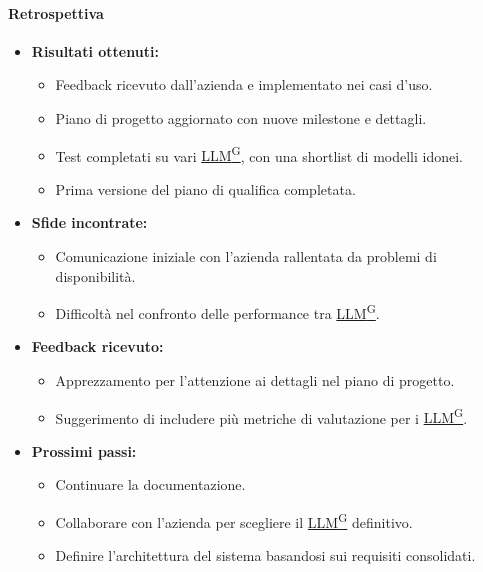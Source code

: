 \documentclass{article}
\begin{document}
                \paragraph{Retrospettiva}
                \begin{itemize}
                    \item \textbf{Risultati ottenuti:}
                    \begin{itemize}
                        \item Feedback ricevuto dall'azienda e implementato nei casi d'uso.
                        \item Piano di progetto aggiornato con nuove milestone e dettagli.
                        \item Test completati su vari \href{https://code7crusaders.github.io/docs/RTB/documentazione_interna/glossario.html#llm-large-language-model}{LLM\textsuperscript{G}}, con una shortlist di modelli idonei.
                        \item Prima versione del piano di qualifica completata.
                    \end{itemize}
                    \item \textbf{Sfide incontrate:}
                    \begin{itemize}
                        \item Comunicazione iniziale con l'azienda rallentata da problemi di disponibilità.
                        \item Difficoltà nel confronto delle performance tra \href{https://code7crusaders.github.io/docs/RTB/documentazione_interna/glossario.html#llm-large-language-model}{LLM\textsuperscript{G}}.
                    \end{itemize}
                    \item \textbf{Feedback ricevuto:}
                    \begin{itemize}
                        \item Apprezzamento per l'attenzione ai dettagli nel piano di progetto.
                        \item Suggerimento di includere più metriche di valutazione per i \href{https://code7crusaders.github.io/docs/RTB/documentazione_interna/glossario.html#llm-large-language-model}{LLM\textsuperscript{G}}.
                    \end{itemize}
                    \item \textbf{Prossimi passi:}
                    \begin{itemize}
                        \item Continuare la documentazione.
                        \item Collaborare con l'azienda per scegliere il \href{https://code7crusaders.github.io/docs/RTB/documentazione_interna/glossario.html#llm-large-language-model}{LLM\textsuperscript{G}} definitivo.
                        \item Definire l'architettura del sistema basandosi sui requisiti consolidati.
                    \end{itemize}
                \end{itemize}
\end{document}
